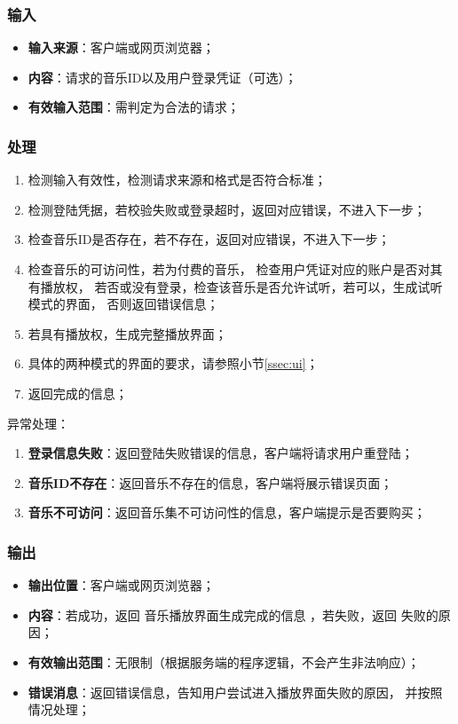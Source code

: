 \subsubsection{输入}
	\begin{itemize}
		\item \textbf{输入来源}：客户端或网页浏览器；
		\item \textbf{内容}：请求的音乐ID以及用户登录凭证（可选）；
		\item \textbf{有效输入范围}：需判定为合法的请求；
	\end{itemize}
\subsubsection{处理}
	\begin{enumerate}
		\item 检测输入有效性，检测请求来源和格式是否符合标准；
		\item 检测登陆凭据，若校验失败或登录超时，返回对应错误，不进入下一步；
		\item 检查音乐ID是否存在，若不存在，返回对应错误，不进入下一步；
		\item 检查音乐的可访问性，若为付费的音乐，
			检查用户凭证对应的账户是否对其有播放权，
			若否或没有登录，检查该音乐是否允许试听，若可以，生成试听模式的界面，
			否则返回错误信息；
		\item 若具有播放权，生成完整播放界面；
		\item 具体的两种模式的界面的要求，请参照小节\ref{ssec:ui}；
		\item 返回完成的信息；
	\end{enumerate}
	\noindent 异常处理：
	\begin{enumerate}
		\item \textbf{登录信息失败}：返回登陆失败错误的信息，客户端将请求用户重登陆；
		\item \textbf{音乐ID不存在}：返回音乐不存在的信息，客户端将展示错误页面；
		\item \textbf{音乐不可访问}：返回音乐集不可访问性的信息，客户端提示是否要购买；
	\end{enumerate}
\subsubsection{输出}
\begin{itemize}
	\item \textbf{输出位置}：客户端或网页浏览器；
	\item \textbf{内容}：若成功，返回 音乐播放界面生成完成的信息 ，若失败，返回 失败的原因；
	\item \textbf{有效输出范围}：无限制（根据服务端的程序逻辑，不会产生非法响应）；
	\item \textbf{错误消息}：返回错误信息，告知用户尝试进入播放界面失败的原因，
		并按照情况处理；
\end{itemize}

